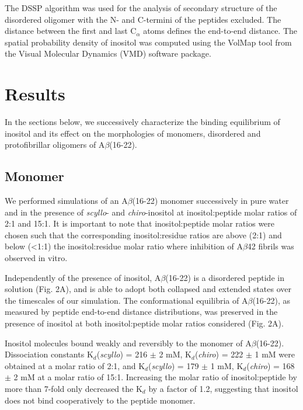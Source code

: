 The DSSP algorithm was used for the analysis of secondary structure of the disordered oligomer with the N- and C-termini of the peptides excluded. The distance between the first and last C$_{\alpha}$ atoms defines the end-to-end distance. The spatial probability density of inositol was computed using the VolMap tool from the Visual Molecular Dynamics (VMD) software package.\cite{Humphrey:1996p850}

\section{Results}

In the sections below, we successively characterize the binding equilibrium of inositol and its effect on the morphologies of monomers, disordered and protofibrillar oligomers of A$\beta$(16-22).  

\subsection{Monomer}

We performed simulations of an A$\beta$(16-22) monomer successively in pure water and in the presence of \emph{scyllo}- and \emph{chiro}-inositol at inositol:peptide molar ratios of 2:1 and 15:1.  It is important to note that inositol:peptide molar ratios were chosen such that the corresponding inositol:residue ratios are above (2:1) and below (<1:1) the inositol:residue molar ratio where inhibition of A$\beta$42 fibrils was observed in vitro.\cite{McLaurin:1998p176}

Independently of the presence of inositol, A$\beta$(16-22) is a disordered peptide in solution (Fig. 2A), and is able to adopt both collapsed and extended states over the timescales of our simulation. The conformational equilibria of A$\beta$(16-22), as measured by peptide end-to-end distance distributions, was preserved in the presence of inositol at both inositol:peptide molar ratios considered (Fig. 2A).  

Inositol molecules bound weakly and reversibly to the monomer of A$\beta$(16-22). Dissociation constants K$_d$(\emph{scyllo}) = 216 $\pm$ 2 mM, K$_d$(\emph{chiro}) = 222 $\pm$ 1 mM were obtained at a molar ratio of 2:1, and K$_d$(\emph{scyllo}) = 179 $\pm$ 1 mM, K$_d$(\emph{chiro}) = 168 $\pm$ 2 mM at a molar ratio of 15:1. Increasing the molar ratio of inositol:peptide by more than 7-fold only decreased the K$_d$ by a factor of 1.2, suggesting that inositol does not bind cooperatively to the peptide monomer.

